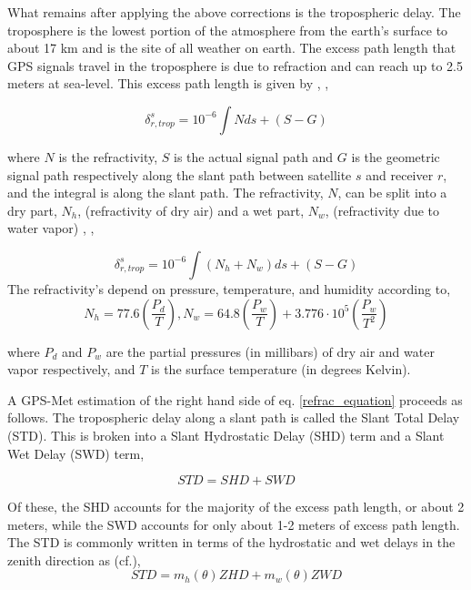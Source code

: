 \documentclass[proposal]{umassthesis}
\begin{document}
What remains after applying the above corrections is the tropospheric delay. The troposphere is the lowest portion of the atmosphere from the earth's surface to about 17 km and is the site of all weather on earth. The excess path length that GPS signals travel in the troposphere is due to refraction and can reach up to 2.5 meters at sea-level. This excess path length is given by \cite{bevis1992gps}, \cite{ming2014},

\begin{equation}
\delta_{r,trop}^s = 10^{-6} \int N ds + (S - G)
\end{equation}

where $N$ is the refractivity, $S$ is the actual signal path and $G$ is the geometric signal path respectively along the slant path between satellite $s$ and receiver $r$, and the integral is along the slant path. The refractivity, $N$, can be split into a dry part, $N_h$, (refractivity of dry air) and a wet part, $N_w$, (refractivity due to water vapor) \cite{davis1985geodesy}, \cite{saastamoinen1972atmospheric},

\begin{equation}
\label{refrac_equation}
\delta_{r,trop}^s = 10^{-6} \int (N_h + N_w) ds + (S - G)
\end{equation}
The refractivity's depend on pressure, temperature, and humidity according to,
\begin{equation}
N_h = 77.6 (\dfrac{P_d}{T}), N_w = 64.8 (\dfrac{P_w}{T}) + 3.776 \cdot 10^{5} (\dfrac{P_w}{T^2})
\end{equation}

where $P_d$ and $P_w$ are the partial pressures (in millibars) of dry air and water vapor respectively, and $T$ is the surface temperature (in degrees Kelvin).

A GPS-Met estimation of the right hand side of eq. \ref{refrac_equation} proceeds as follows. The tropospheric delay along a slant path is called the Slant Total Delay (STD). This is broken into a Slant Hydrostatic Delay (SHD) term and a Slant Wet Delay (SWD) term,

\begin{equation}
STD = SHD + SWD
\end{equation}

Of these, the SHD accounts for the majority of the excess path length, or about 2 meters, while the SWD accounts for only about 1-2 meters of excess path length. The STD is commonly written in terms of the hydrostatic and wet delays in the zenith direction as (cf.\cite{duan1996gps}),
\begin{equation}
STD = m_h(\theta) ZHD + m_w(\theta) ZWD
\end{equation}
\end{document}
